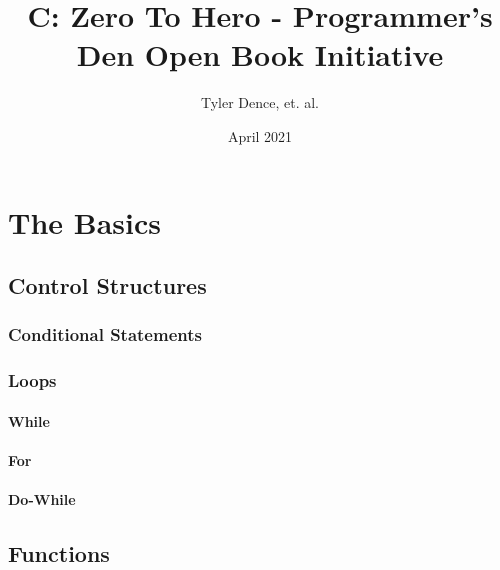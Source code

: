 \documentclass[14pt,table]{extbook}
\title{C: Zero To Hero - Programmer's Den Open Book Initiative}
\author{Tyler Dence, et. al.}
\date{April 2021}
\begin{document}
\frontmatter
    \setcounter{page}{0}
    
    \setcounter{secnumdepth}{-1}
    
    
    
    
    
    
    \tableofcontents
    
    \clearpage
    \markboth{}{}


    \setcounter{secnumdepth}{3}

\mainmatter
	\part{The Basics}
		
		

		\chapter{Control Structures}
			\section{Conditional Statements}
			\section{Loops}
				\subsection{While}
				\subsection{For}
				\subsection{Do-While}

		\chapter{Functions}
\end{document}
